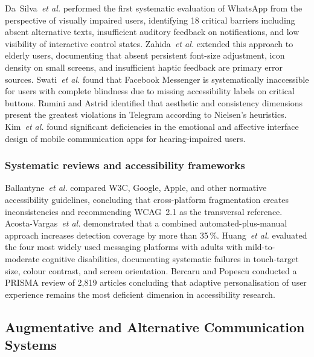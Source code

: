 \documentclass[journal]{IEEEtran}
\begin{document}
	Da~Silva~\textit{et al.} \cite{dasilva2016} performed the first
	systematic evaluation of WhatsApp from the perspective of visually
	impaired users, identifying 18 critical barriers including
	absent alternative texts, insufficient auditory feedback on
	notifications, and low visibility of interactive control states.
	Zahida~\textit{et al.} \cite{zahida2021} extended this approach
	to elderly users, documenting that absent persistent font-size
	adjustment, icon density on small screens, and insufficient
	haptic feedback are primary error sources.
	Swati~\textit{et al.} \cite{swati2021} found that Facebook
	Messenger is systematically inaccessible for users with complete
	blindness due to missing accessibility labels on critical buttons.
	Rumini and Astrid \cite{rumini2019} identified that aesthetic and
	consistency dimensions present the greatest violations in
	Telegram according to Nielsen's heuristics.
	Kim~\textit{et al.} \cite{kim2024} found significant deficiencies
	in the emotional and affective interface design of mobile
	communication apps for hearing-impaired users.
	
	\subsubsection{Systematic reviews and accessibility frameworks}
	Ballantyne~\textit{et al.} \cite{ballantyne2018} compared W3C,
	Google, Apple, and other normative accessibility guidelines,
	concluding that cross-platform fragmentation creates inconsistencies
	and recommending WCAG~2.1 as the transversal reference.
	Acosta-Vargas~\textit{et al.} \cite{acosta2021} demonstrated that
	a combined automated-plus-manual approach increases detection
	coverage by more than 35\,\%.
	Huang~\textit{et al.} \cite{huang2025} evaluated the four most
	widely used messaging platforms with adults with mild-to-moderate
	cognitive disabilities, documenting systematic failures in
	touch-target size, colour contrast, and screen orientation.
	Bercaru and Popescu \cite{bercaru2024} conducted a PRISMA review of
	2{,}819 articles concluding that adaptive personalisation of user
	experience remains the most deficient dimension in accessibility
	research.
	
	\subsection{Augmentative and Alternative Communication Systems}
	
\end{document}

